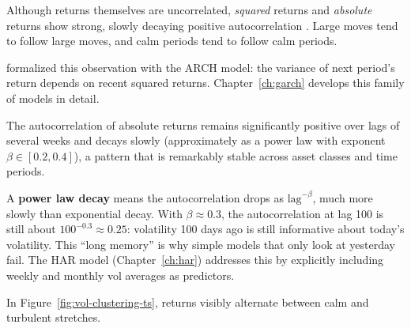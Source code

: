 Although returns themselves are uncorrelated, \emph{squared} returns and \emph{absolute} returns show strong, slowly decaying positive autocorrelation \citep{Cont2001, Mandelbrot1963}.
Large moves tend to follow large moves, and calm periods tend to follow calm periods.

\citet{Engle1982} formalized this observation with the ARCH model: the variance of next period's return depends on recent squared returns.
Chapter~\ref{ch:garch} develops this family of models in detail.

\begin{keyresult}
The autocorrelation of absolute returns remains significantly positive over lags of several weeks and decays slowly (approximately as a power law with exponent $\beta \in [0.2, 0.4]$), a pattern that is remarkably stable across asset classes and time periods.
\end{keyresult}

\begin{intuition}
A \textbf{power law decay} means the autocorrelation drops as $\text{lag}^{-\beta}$, much more slowly than exponential decay.
With $\beta \approx 0.3$, the autocorrelation at lag 100 is still about $100^{-0.3} \approx 0.25$: volatility 100 days ago is still informative about today's volatility.
This ``long memory'' is why simple models that only look at yesterday fail.
The HAR model (Chapter~\ref{ch:har}) addresses this by explicitly including weekly and monthly vol averages as predictors.
\end{intuition}

In Figure~\ref{fig:vol-clustering-ts}, returns visibly alternate between calm and turbulent stretches.

